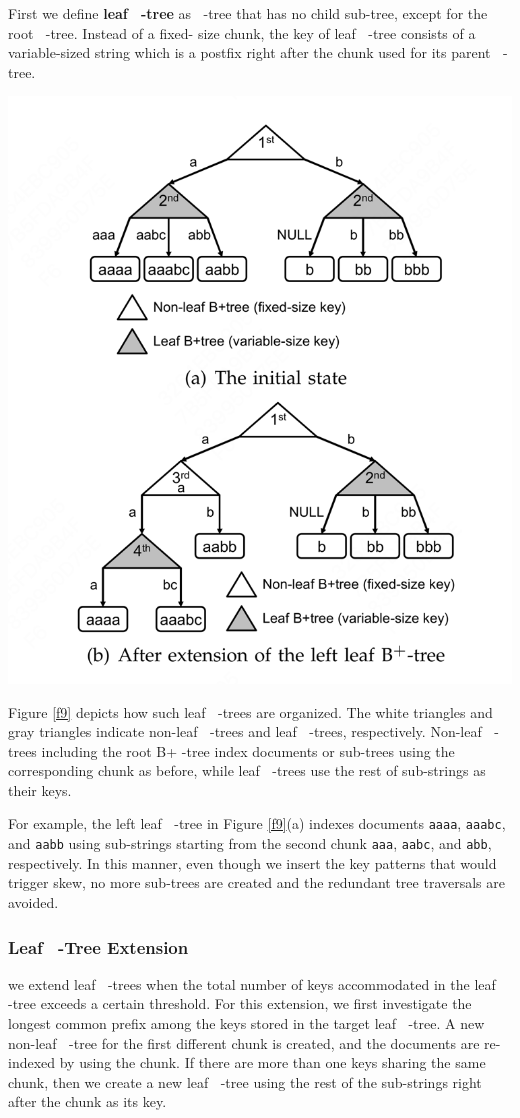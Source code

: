 \documentclass[11pt]{article}
\DeclareMathOperator{\BP}{\text{B}^+}
\begin{document}
First we define \textbf{leaf \(\BP\)-tree} as \(\BP\)-tree that has no child sub-tree, except for the root
\(\BP\)-tree. Instead of a fixed- size chunk, the key of leaf \(\BP\)-tree consists of a
variable-sized string which is a postfix right after the chunk used for its parent \(\BP\)-tree.

\begin{center}
\includegraphics[width=.8\textwidth]{../../images/papers/151.png}
\end{center}

Figure \ref{f9} depicts how such leaf \(\BP\)-trees are organized. The white triangles and gray
triangles indicate non-leaf \(\BP\)-trees and leaf \(\BP\)-trees, respectively. Non-leaf \(\BP\)-trees
including the root B+ -tree index documents or sub-trees using the corresponding chunk as before,
while leaf \(\BP\)-trees use the rest of sub-strings as their keys.

For example, the left leaf \(\BP\)-tree in Figure \ref{f9}(a) indexes documents \texttt{aaaa}, \texttt{aaabc}, and \texttt{aabb}
using sub-strings starting from the second chunk \texttt{aaa}, \texttt{aabc}, and \texttt{abb}, respectively. In this manner,
even though we insert the key patterns that would trigger skew, no more sub-trees are created and the
redundant tree traversals are avoided.
\subsubsection{Leaf \(\BP\)-Tree Extension}
\label{sec:org6bcc6c8}
we extend leaf \(\BP\)-trees when the total number of keys accommodated in the leaf \(\BP\)-tree
exceeds a certain threshold. For this extension, we first investigate the longest common prefix among
the keys stored in the target leaf \(\BP\)-tree. A new non-leaf \(\BP\)-tree for the first different
chunk is created, and the documents are re-indexed by using the chunk. If there are more than one keys
sharing the same chunk, then we create a new leaf \(\BP\)-tree using the rest of the sub-strings right
after the chunk as its key.
\end{document}
